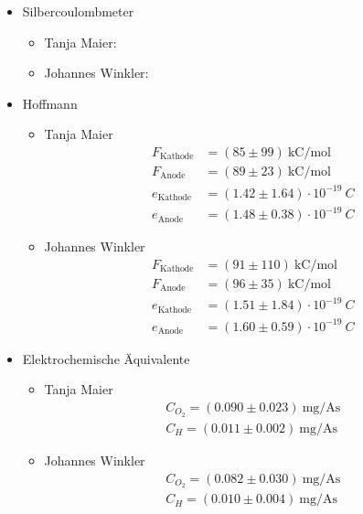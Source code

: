\documentclass{article}
\begin{document}
\begin{itemize}

\item Silbercoulombmeter
\begin{itemize}
\item Tanja Maier:

\item Johannes Winkler:

\end{itemize}

\item Hoffmann
\begin{itemize}
\item Tanja Maier
\begin{align*}
F_\text{Kathode} &= (85 \pm 99)~\text{kC/mol}\\
F_\text{Anode} &= (89 \pm 23)~\text{kC/mol} \\
e_\text{Kathode} &= (1.42 \pm 1.64)\cdot 10^{-19}~C \\
e_\text{Anode} &= (1.48 \pm 0.38)\cdot 10^{-19}~C  
\end{align*}
\item Johannes Winkler
\begin{align*}
F_\text{Kathode} &= (91 \pm 110)~\text{kC/mol}\\
F_\text{Anode} &= (96 \pm 35)~\text{kC/mol} \\
e_\text{Kathode} &= (1.51 \pm 1.84)\cdot 10^{-19}~C \\
e_\text{Anode} &= (1.60 \pm 0.59)\cdot 10^{-19}~C  
\end{align*}

\end{itemize}
\item Elektrochemische Äquivalente
\begin{itemize}
\item Tanja Maier
\begin{align*}
C_{O_2} = (0.090 \pm 0.023)~\text{mg}/\text{As} \\
C_{H} = (0.011 \pm 0.002)~\text{mg}/\text{As} 
\end{align*}

\item Johannes Winkler
\begin{align*}
C_{O_2} = (0.082 \pm 0.030)~\text{mg}/\text{As} \\
C_{H} = (0.010 \pm 0.004)~\text{mg}/\text{As} 
\end{align*}

\end{itemize}
\end{itemize}
\end{document}
